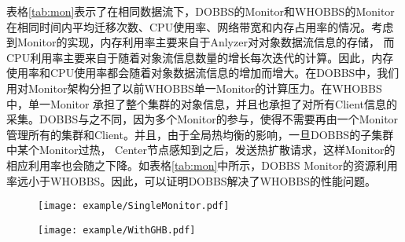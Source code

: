 表格\ref{tab:mon}表示了在相同数据流下，DOBBS的Monitor和WHOBBS的Monitor在相同时间内平均迁移次数、CPU使用率、网络带宽和内存占用率的情况。考虑到Monitor的实现，内存利用率主要来自于Anlyzer对对象数据流信息的存储，
而CPU利用率主要来自于随着对象流信息数量的增长每次迭代的计算。因此，内存使用率和CPU使用率都会随着对象数据流信息的增加而增大。在DOBBS中，我们用对Monitor架构分担了以前WHOBBS单一Monitor的计算压力。在WHOBBS中，单一Monitor
承担了整个集群的对象信息，并且也承担了对所有Client信息的采集。DOBBS与之不同，因为多个Monitor的参与，使得不需要再由一个Monitor管理所有的集群和Client。并且，由于全局热均衡的影响，一旦DOBBS的子集群中某个Monitor过热，
Center节点感知到之后，发送热扩散请求，这样Monitor的相应利用率也会随之下降。如表格\ref{tab:mon}中所示，DOBBS Monitor的资源利用率远小于WHOBBS。因此，可以证明DOBBS解决了WHOBBS的性能问题。

\begin{figure}[!htp]
    \centering
    \texttt{[image: example/SingleMonitor.pdf]}
\end{figure}

\begin{figure}[!htp]
    \centering
    \texttt{[image: example/WithGHB.pdf]}
\end{figure}